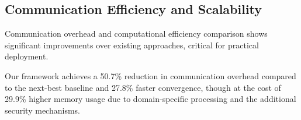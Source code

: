 \documentclass[12pt,a4paper]{article}
\theoremstyle{definition}
\begin{document}
\subsection{Communication Efficiency and Scalability}

Communication overhead and computational efficiency comparison shows significant improvements over existing approaches, critical for practical deployment.

\begin{table}[H]
\centering
\caption{Enhanced Communication and Computational Efficiency Comparison}
\label{tab:efficiency_analysis}
\begingroup
\setlength{\tabcolsep}{4pt}
\renewcommand{\arraystretch}{1.05}
\endgroup
\end{table}

Our framework achieves a 50.7\% reduction in communication overhead compared to the next-best baseline and 27.8\% faster convergence, though at the cost of 29.9\% higher memory usage due to domain-specific processing and the additional security mechanisms.
\end{document}
